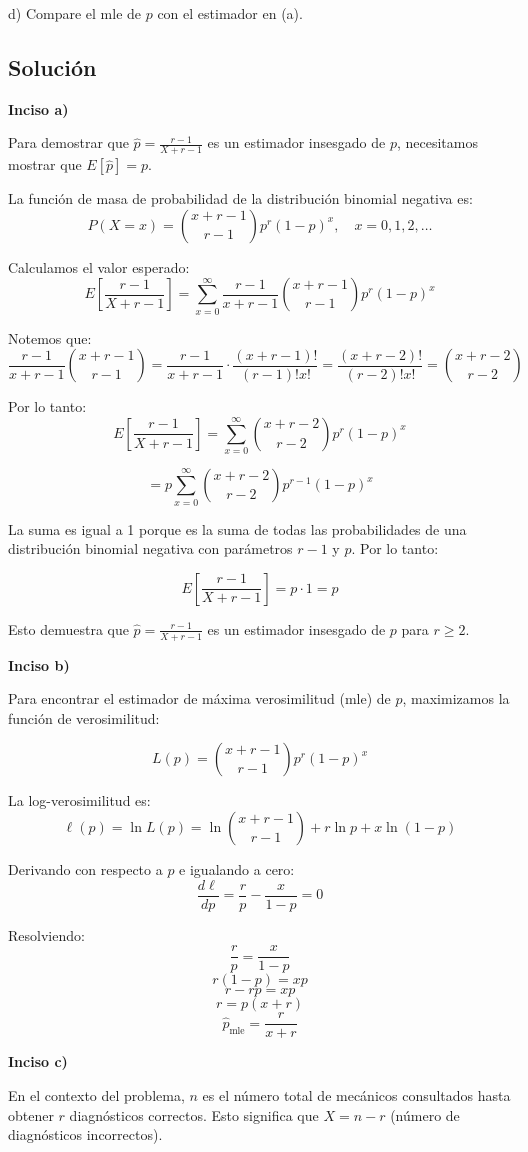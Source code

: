 \documentclass[12pt]{article}
\begin{document}
d) Compare el mle de $p$ con el estimador en (a).

\subsection{Solución}

\textbf{Inciso a)}

Para demostrar que $\hat{p} = \frac{r-1}{X+r-1}$ es un estimador insesgado de $p$, necesitamos mostrar que $E[\hat{p}] = p$.

La función de masa de probabilidad de la distribución binomial negativa es:
$$P(X = x) = \binom{x+r-1}{r-1} p^r (1-p)^x, \quad x = 0, 1, 2, \ldots$$

Calculamos el valor esperado:
$$E\left[\frac{r-1}{X+r-1}\right] = \sum_{x=0}^{\infty} \frac{r-1}{x+r-1} \binom{x+r-1}{r-1} p^r (1-p)^x$$

Notemos que:
$$\frac{r-1}{x+r-1} \binom{x+r-1}{r-1} = \frac{r-1}{x+r-1} \cdot \frac{(x+r-1)!}{(r-1)!x!} = \frac{(x+r-2)!}{(r-2)!x!} = \binom{x+r-2}{r-2}$$

Por lo tanto:
$$E\left[\frac{r-1}{X+r-1}\right] = \sum_{x=0}^{\infty} \binom{x+r-2}{r-2} p^r (1-p)^x$$

$$= p \sum_{x=0}^{\infty} \binom{x+r-2}{r-2} p^{r-1} (1-p)^x$$

La suma es igual a 1 porque es la suma de todas las probabilidades de una distribución binomial negativa con parámetros $r-1$ y $p$. Por lo tanto:

$$E\left[\frac{r-1}{X+r-1}\right] = p \cdot 1 = p$$

Esto demuestra que $\hat{p} = \frac{r-1}{X+r-1}$ es un estimador insesgado de $p$ para $r \geq 2$.

\textbf{Inciso b)}

Para encontrar el estimador de máxima verosimilitud (mle) de $p$, maximizamos la función de verosimilitud:

$$L(p) = \binom{x+r-1}{r-1} p^r (1-p)^x$$

La log-verosimilitud es:
$$\ell(p) = \ln L(p) = \ln\binom{x+r-1}{r-1} + r\ln p + x\ln(1-p)$$

Derivando con respecto a $p$ e igualando a cero:
$$\frac{d\ell}{dp} = \frac{r}{p} - \frac{x}{1-p} = 0$$

Resolviendo:
$$\frac{r}{p} = \frac{x}{1-p}$$
$$r(1-p) = xp$$
$$r - rp = xp$$
$$r = p(x+r)$$
$$\hat{p}_{\text{mle}} = \frac{r}{x+r}$$

\textbf{Inciso c)}

En el contexto del problema, $n$ es el número total de mecánicos consultados hasta obtener $r$ diagnósticos correctos. Esto significa que $X = n - r$ (número de diagnósticos incorrectos).
\end{document}
